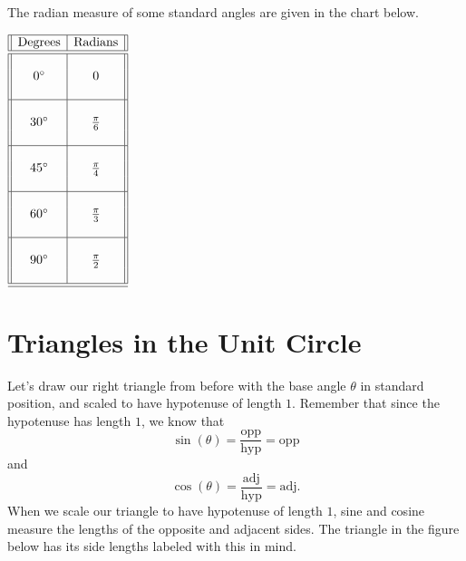 \documentclass[nooutcomes]{ximera}
\begin{document}
The radian measure of some standard angles are given in the chart below.
\begin{center}
$
\begin{array}{||c|c||}
\hline
\text{Degrees}&\text{Radians}\\
\hline 
\hline
 & \\
0^\circ &0\\
 & \\
\hline
 & \\
30^\circ&\frac{\pi}{6}\\
& \\
\hline
& \\
45^\circ&\frac{\pi}{4}\\
& \\
\hline
& \\
60^\circ&\frac{\pi}{3}\\
& \\
\hline
& \\
90^\circ&\frac{\pi}{2}\\
& \\
\hline 
\hline
\end{array}
$
\end{center}


\section{Triangles in the Unit Circle}
Let's draw our right triangle from before with the base angle $\theta$ in standard position, and scaled to have hypotenuse of length $1$.
Remember that since the hypotenuse has length $1$, we know that 
$$  \sin(\theta) = \frac{\text{opp}}{\text{hyp}} = \text{opp}$$ and
$$   \cos(\theta) = \frac{\text{adj}}{\text{hyp}} = \text{adj}.$$ 
When we scale our triangle to have hypotenuse of length $1$, sine and cosine measure the lengths of the opposite and adjacent sides.
The triangle in the figure below has its side lengths labeled with this in mind.
 
\end{document}
